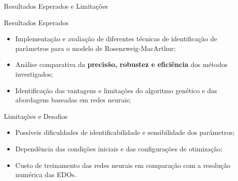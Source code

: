 \begin{frame}{Resultados Esperados e Limitações}

\begin{block}{Resultados Esperados}
\begin{itemize}

    \item Implementação e avaliação de diferentes
    técnicas de identificação de parâmetros
    para o modelo de Rosenzweig-MacArthur;

    \item Análise comparativa da
    \textbf{precisão, robustez e eficiência}
    dos métodos investigados;

    \item Identificação das vantagens e limitações
    do algoritmo genético e das abordagens baseadas
    em redes neurais;
\end{itemize}
\end{block}

\vspace{0.2cm}

\begin{alertblock}{Limitações e Desafios}
\begin{itemize}

    \item Possíveis dificuldades de identificabilidade
    e sensibilidade dos parâmetros;

    \item Dependência das condições iniciais
    e das configurações de otimização;

    \item Custo de treinamento das redes neurais
    em comparação com a resolução numérica das EDOs.
\end{itemize}
\end{alertblock}

\end{frame}
